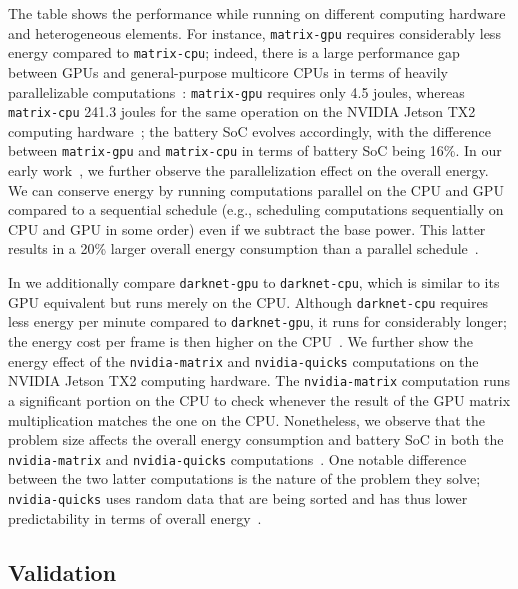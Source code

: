 The table shows the performance while running on different computing hardware and heterogeneous elements. For instance, {\small\tt matrix-gpu} requires considerably less energy compared to {\small\tt matrix-cpu}; indeed, there is a large performance gap between GPUs and general-purpose multicore CPUs in terms of heavily parallelizable computations~\citep{kirk2016programming}: {\small\tt matrix-gpu} requires only 4.5 joules, whereas {\small\tt matrix-cpu} 241.3 joules for the same operation on the NVIDIA Jetson TX2 computing hardware~\citep{seewald2019coarse}; the battery SoC evolves accordingly, with the difference between {\small\tt matrix-gpu} and {\small\tt matrix-cpu} in terms of battery SoC being 16\%. In our early work~\citep{seewald2019coarse,seewald2019component}, we further observe the parallelization effect on the overall energy. We can conserve energy by running computations parallel on the CPU and GPU compared to a sequential schedule (e.g., scheduling computations sequentially on CPU and GPU in some order) even if we subtract the base power. This latter results in a 20\% larger overall energy consumption than a parallel schedule~\citep{seewald2019coarse}.

In  we additionally compare {\small\tt darknet-gpu} to {\small\tt darknet-cpu}, which is similar to its GPU equivalent but runs merely on the CPU. Although {\small\tt darknet-cpu} requires less energy per minute compared to {\small\tt darknet-gpu}, it runs for considerably longer; the energy cost per frame is then higher on the CPU~\citep{seewald2019coarse}. We further show the energy effect of the {\small\tt nvidia-matrix} and {\small\tt nvidia-quicks} computations on the NVIDIA Jetson TX2 computing hardware. The {\small\tt nvidia-matrix} computation runs a significant portion on the CPU to check whenever the result of the GPU matrix multiplication matches the one on the CPU. Nonetheless, we observe that the problem size affects the overall energy consumption and battery SoC in both the {\small\tt nvidia-matrix} and {\small\tt nvidia-quicks} computations~\citep{seewald2019coarse}. One notable difference between the two latter computations is the nature of the problem they solve; {\small\tt nvidia-quicks} uses random data that are being sorted and has thus lower predictability in terms of overall energy~\citep{seewald2019coarse}.

\subsection{Validation}
\label{sec:res-validation-nikov}


